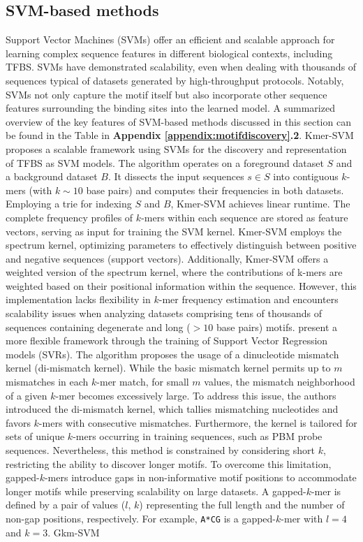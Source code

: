 \documentclass[a4paper, titlepage, openright]{book}
\begin{document}
\subsection{SVM-based methods}\label{subsection:svm-methods-appendix}
Support Vector Machines (SVMs) offer an efficient and scalable approach for learning complex sequence features in different biological contexts, including TFBS. SVMs have demonstrated scalability, even when dealing with thousands of sequences typical of datasets generated by high-throughput protocols. Notably, SVMs not only capture the motif itself but also incorporate other sequence features surrounding the binding sites into the learned model. A summarized overview of the key features of SVM-based methods discussed in this section can be found in the Table in \textbf{Appendix \ref{appendix:motifdiscovery}.2}. Kmer-SVM \citep{lee2011discriminative,fletez2013kmer} proposes a scalable framework using SVMs for the discovery and representation of TFBS as SVM models. The algorithm operates on a foreground dataset $S$ and a background dataset $B$. It dissects the input sequences $s \in S$ into contiguous $k$-mers (with $k \sim 10$ base pairs) and computes their frequencies in both datasets. Employing a trie \citep{bodon2003trie} for indexing $S$ and $B$, Kmer-SVM achieves linear runtime. The complete frequency profiles of $k$-mers within each sequence are stored as feature vectors, serving as input for training the SVM kernel. Kmer-SVM employs the spectrum kernel, optimizing parameters to effectively distinguish between positive and negative sequences (support vectors). Additionally, Kmer-SVM offers a weighted version of the spectrum kernel, where the contributions of k-mers are weighted based on their positional information within the sequence. However, this implementation lacks flexibility in $k$-mer frequency estimation and encounters scalability issues when analyzing datasets comprising tens of thousands of sequences containing degenerate and long ($>10$ base pairs) motifs. \cite{agius2010high} present a more flexible framework through the training of Support Vector Regression models (SVRs). The algorithm proposes the usage of a dinucleotide mismatch kernel (di-mismatch kernel). While the basic mismatch kernel permits up to $m$ mismatches in each $k$-mer match, for small $m$ values, the mismatch neighborhood of a given $k$-mer becomes excessively large. To address this issue, the authors introduced the di-mismatch kernel, which tallies mismatching nucleotides and favors $k$-mers with consecutive mismatches. Furthermore, the kernel is tailored for sets of unique $k$-mers occurring in training sequences, such as PBM probe sequences. Nevertheless, this method is constrained by considering short $k$, restricting the ability to discover longer motifs. To overcome this limitation, gapped-$k$-mers \citep{ghandi2014robust} introduce gaps in non-informative motif positions to accommodate longer motifs while preserving scalability on large datasets. A gapped-$k$-mer is defined by a pair of values ($l$, $k$) representing the full length and the number of non-gap positions, respectively. For example, \texttt{A*CG} is a gapped-$k$-mer with $l=4$ and $k=3$. Gkm-SVM \citep{ghandi2014enhanced,ghandi2016gkmsvm} 
\end{document}
